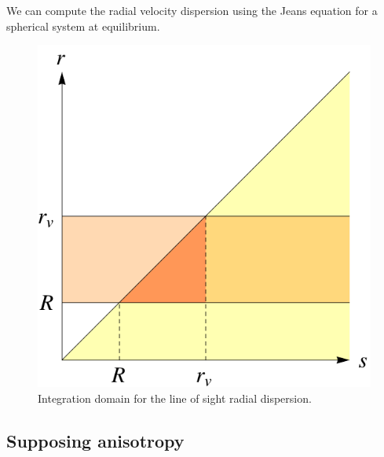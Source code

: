 We can compute the radial velocity dispersion using the Jeans equation for a
spherical system at equilibrium.
%
\begin{figure}[H]
    \centering
    \includegraphics[width=0.5\linewidth]{figures/los_variance/domint}
    \caption{Integration domain for the line of sight radial
    dispersion.\label{fig:domint}}
\end{figure}

\subsection{Supposing \citet{Mamon+05} anisotropy}

